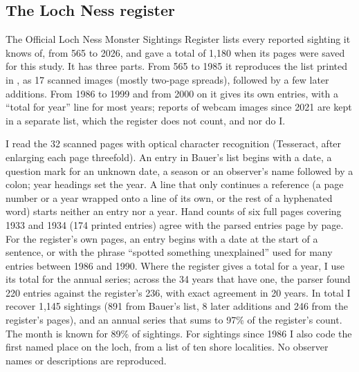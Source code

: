 \documentclass[11pt,a4paper]{article}
\begin{document}
\subsection{The Loch Ness register}
The Official Loch Ness Monster Sightings Register \citep{register2026} lists every reported sighting it knows of, from 565 to 2026, and gave a total of 1,180 when its pages were saved for this study. It has three parts. From 565 to 1985 it reproduces the list printed in \citet{bauer1986}, as 17 scanned images (mostly two-page spreads), followed by a few later additions. From 1986 to 1999 and from 2000 on it gives its own entries, with a ``total for year'' line for most years; reports of webcam images since 2021 are kept in a separate list, which the register does not count, and nor do I.

I read the 32 scanned pages with optical character recognition (Tesseract, after enlarging each page threefold). An entry in Bauer's list begins with a date, a question mark for an unknown date, a season or an observer's name followed by a colon; year headings set the year. A line that only continues a reference (a page number or a year wrapped onto a line of its own, or the rest of a hyphenated word) starts neither an entry nor a year. Hand counts of six full pages covering 1933 and 1934 (174 printed entries) agree with the parsed entries page by page. For the register's own pages, an entry begins with a date at the start of a sentence, or with the phrase ``spotted something unexplained'' used for many entries between 1986 and 1990. Where the register gives a total for a year, I use its total for the annual series; across the 34 years that have one, the parser found 220 entries against the register's 236, with exact agreement in 20 years. In total I recover 1,145 sightings (891 from Bauer's list, 8 later additions and 246 from the register's pages), and an annual series that sums to 97\% of the register's count. The month is known for 89\% of sightings. For sightings since 1986 I also code the first named place on the loch, from a list of ten shore localities. No observer names or descriptions are reproduced.
\end{document}
